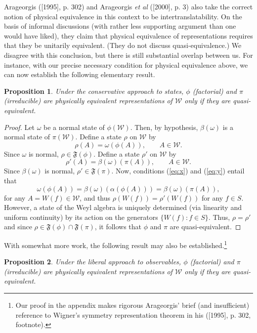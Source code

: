 \documentclass[12pt]{article}
\newtheorem{prop}{Proposition}
\theoremstyle{remark}
\theoremstyle{definition}
\newcommand{\alg}[1]{\mathcal{#1}}
\begin{document}
Arageorgis ([1995], p. 302) and Arageorgis \emph{et al} ([2000], p. 3)
also take the correct notion of physical equivalence in this context
to be intertranslatability.  On the basis of informal discussions
(with rather less supporting argument than one would have liked), they
claim that physical equivalence of representations requires that they
be unitarily equivalent.  (They do not discuss quasi-equivalence.) We
disagree with this conclusion, but there is still substantial overlap
between us.  For instance, with our precise necessary condition for
physical equivalence above, we can now establish the following
elementary result.
 \begin{prop} \label{hi} Under the conservative approach to states, 
   $\phi$ (factorial) and $\pi$ (irreducible) are physically
   equivalent representations of $\alg{W}$ only if they are
   quasi-equivalent.  \end{prop}
 
 \begin{proof} Let $\omega$ be a normal state of $\phi (\alg{W})$.  Then, by 
   hypothesis, $\beta(\omega)$ is a normal state of $\pi (\alg{W})$.
   Define a state $\rho$ on $\alg{W}$ by \begin{equation} \rho
     (A)=\omega (\phi (A)) ,\qquad A\in \alg{W} .\end{equation} Since
   $\omega$ is normal, $\rho \in \mathfrak{F}(\phi )$.  Define a state
   $\rho '$ on $\alg{W}$ by 
\begin{equation}
\rho '(A)=\beta (\omega)(\pi (A)) ,\qquad A\in \alg{W}.\end{equation}
Since $\beta (\omega)$ is normal, $\rho '\in \mathfrak{F}(\pi )$.
Now, conditions (\ref{eq:x}) and
   (\ref{eq:y}) entail that \begin{equation}
\omega (\phi (A))=\beta (\omega)(\alpha (\phi (A)))=\beta
(\omega)(\pi (A)) ,\end{equation}
for any $A=W(f)\in \alg{W}$, and thus $\rho (W(f))=\rho '(W(f))$ for
any $f\in S$.  However, a state of the Weyl algebra is 
uniquely determined (via linearity
   and uniform continuity) by its action on the generators
   $\{W(f):f\in S\}$.  Thus, $\rho =\rho '$ and since $\rho \in 
\mathfrak{F}(\phi)\cap \mathfrak{F}(\pi )$, it follows that $\phi$ and
$\pi$ are quasi-equivalent.
 \end{proof}
 
\noindent With somewhat more work, 
the following result may also be established.\footnote{Our proof in
  the appendix makes rigorous Arageorgis' brief (and insufficient)
  reference to Wigner's symmetry representation theorem in his
  ([1995], p. 302, footnote).}
 \begin{prop} \label{frog} Under the liberal approach to observables, 
 $\phi$ (factorial) and $\pi$ (irreducible) are 
 physically equivalent representations of 
 $\alg{W}$ only if they are 
 quasi-equivalent.  \end{prop}
  
\end{document}
